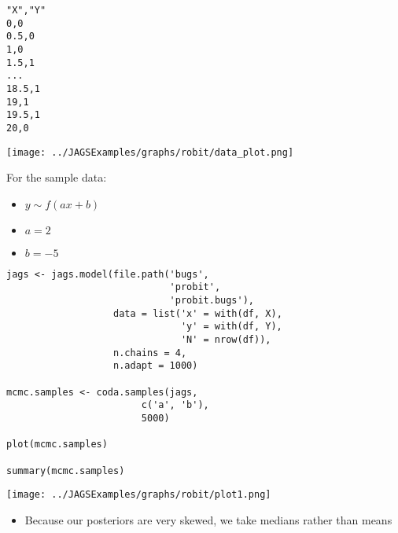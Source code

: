 \documentclass{beamer}
\begin{document}
\begin{frame}[fragile]
  \begin{verbatim}
"X","Y"
0,0
0.5,0
1,0
1.5,1
...
18.5,1
19,1
19.5,1
20,0
  \end{verbatim}
\end{frame}

\begin{frame}[fragile]
  \begin{center}
    \texttt{[image: ../JAGSExamples/graphs/robit/data\_plot.png]}
  \end{center}
\end{frame}

\begin{frame}
  For the sample data:
  \begin{itemize}
    \item{$y \sim f(ax + b)$}
    \item{$a = 2$}
    \item{$b = -5$}
  \end{itemize}
\end{frame}

\begin{frame}[fragile]
  \begin{verbatim}
jags <- jags.model(file.path('bugs',
                             'probit',
                             'probit.bugs'),
                   data = list('x' = with(df, X),
                               'y' = with(df, Y),
                               'N' = nrow(df)),
                   n.chains = 4,
                   n.adapt = 1000)
 
mcmc.samples <- coda.samples(jags,
                        c('a', 'b'),
                        5000)

plot(mcmc.samples)

summary(mcmc.samples)
  \end{verbatim}
\end{frame}

\begin{frame}[fragile]
  \begin{center}
    \texttt{[image: ../JAGSExamples/graphs/robit/plot1.png]}
  \end{center}
\end{frame}

\begin{frame}
  \begin{itemize}
    \item{Because our posteriors are very skewed, we take medians rather than means}
  \end{itemize}
\end{frame}
\end{document}
